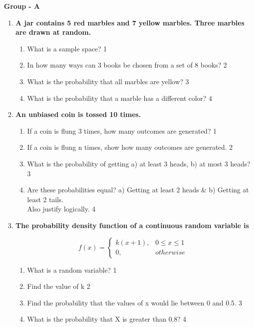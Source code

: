 \documentclass[12pt]{article}
\begin{document}
\begin{center}
\textbf{Group  - A}
\end{center}

  \begin{enumerate}
  
    \item
	  \textbf{A jar contains 5 red marbles and 7 yellow marbles. 
	  Three marbles are drawn at random.} 
  
  \begin{enumerate}
        \item What is a sample space? \hfill 1
    \item
In how many ways can 3 books be chosen from a set of 8 books? \hfill 2
    \item  
	What is the probability that all marbles are yellow? \hfill 3
    \item
	What is the probability that a marble has a different color? \hfill 4
  \end{enumerate}
  

    \item
	  \textbf{An unbiased coin is tossed 10 times.} 
  
  \begin{enumerate}
    \item
	If a coin is flung 3 times, how many outcomes are generated? \hfill 1
    \item
	If a coin is flung n times, show how many outcomes are generated. \hfill 2
    \item  
	What is the probability of getting a) at least 3 heads, b) at most 3 heads? \hfill 3
    \item
	Are these probabilities equal? a) Getting at least 2 heads \& b) Getting at least 2 tails. \\ Also justify logically. \hfill 4
  \end{enumerate}
  
    \item
  \textbf{The probability density function of a continuous random variable is}

$$
  f(x) =
\begin{cases}
k(x+1),  & 0 \le x \le 1 \\
0, & otherwise
\end{cases}
$$


  \begin{enumerate}
    \item
	What is a random variable? \hfill 1
    \item
    	Find the value of k \hfill 2
    \item
    	Find the probability that the values of x would lie between 0 and 0.5. \hfill 3
     \item
     	What is the probability that X is greater than 0.8?  \hfill 4
  \end{enumerate}
  



\end{enumerate}
\end{document}
